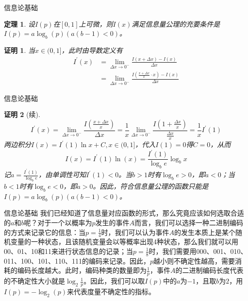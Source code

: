 \documentclass{ctexbeamer}        %
\newtheorem{theorem_}{定理}
\newtheorem{proof_}{证明}
\begin{document}
\begin{frame}{信息论基础}
\begin{theorem_}
设$I(p)$在$[0,1]$上可微，则$I(x)$满足信息量公理的充要条件是 $I(p)=a\log_{b}(p)(a(b-1)<0)$。
\end{theorem_}
\begin{proof_}
当$x\in (0,1]$，此时由导数定义有
\begin{align*}
I^{'}(x) &= \lim_{\Delta x\rightarrow 0^-}\frac{I(x+\Delta x)-I(x)}{\Delta x} \\
&= \lim_{\Delta x\rightarrow 0^-}\frac{I(\frac{x+\Delta x}{x}\cdot x)-I(x)}{\Delta x} 
\end{align*}
\end{proof_}

\end{frame}
\begin{frame}{信息论基础}
\begin{proof_}[续]
$$
I^{'}(x)= \lim_{\Delta x\rightarrow 0^-}\frac{I(\frac{x+\Delta x}{x})}{\Delta x}= \frac{1}{x}\lim_{\Delta x\rightarrow 0^-}\frac{I(1+\frac{\Delta x}{x})}{\frac{\Delta x}{x}} = \frac{1}{x}I^{'}(1)
$$
两边积分$I(x)=I^{'}(1)\ln x+C,x\in(0,1]$，代入$I(1)=0$得$C=0$，从而
$$
I(x)=I^{'}(1)\ln(x)=\frac{I^{'}(1)}{\log_be}\log_bx
$$
记$a=\frac{I^{'}(1)}{\log_be}$，由单调性可知$I^{'}(1)<0$。当$b>1$时有$\log_be>0$，即$a<0$；当$b<1$时有$\log_be<0$，即$a>0$。因此，符合信息量公理的函数只能是$I(p)=a\log_{b}(p)(a(b-1)<0)$。
\end{proof_}
\end{frame}
\begin{frame}{信息论基础}
我们已经知道了信息量对应函数的形式，那么究竟应该如何选取合适的$a$和$b$呢？对于一个以概率为$p$发生的事件$A$而言，我们可以选择一种二进制编码的方式来记录它的信息：当$p=\frac{1}{4}$时，我们可以认为事件$A$的发生本质上是某个随机变量的一种状态，且该随机变量会以等概率出现4种状态，那么我们就可以用00、01、10和11来进行状态信息的记录；当$p=\frac{1}{8}$时，我们需要用000、001、010、011、100、101、110、111的编码来记录。因此，$p$越小则不确定性越高，需要消耗的编码长度越大。此时，编码种类的数量即为$\frac{1}{p}$，事件$A$的二进制编码长度代表的不确定性大小就是$\log_2\frac{1}{p}$。因此，我们可以取$I(p)$中的$a$为$-1$，且取$b$为$2$，用$I(p)=-\log_2(p)$来代表度量不确定性的指标。
\end{frame}
\end{document}
